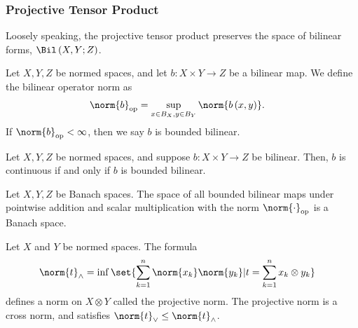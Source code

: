 \documentclass[10pt]{mypackage}
\begin{document}
\subsubsection{Projective Tensor Product}%
Loosely speaking, the projective tensor product preserves the space of bilinear forms, $\Bil\left(X,Y;Z\right)$.
\begin{definition}
  Let $X,Y,Z$ be normed spaces, and let $b: X\times Y\rightarrow Z$ be a bilinear map. We define the bilinear operator norm as
  \begin{align*}
    \norm{b}_{\text{op}} &= \sup_{x\in B_X,y\in B_Y}\norm{b\left(x,y\right)}.
  \end{align*}
  If $\norm{b}_{\text{op}} < \infty$, then we say $b$ is bounded bilinear.
\end{definition}
\begin{proposition}
  Let $X,Y,Z$ be normed spaces, and suppose $b: X\times Y\rightarrow Z$ be bilinear. Then, $b$ is continuous if and only if $b$ is bounded bilinear.
\end{proposition}
\begin{proposition}
  Let $X,Y,Z$ be Banach spaces. The space of all bounded bilinear maps under pointwise addition and scalar multiplication with the norm $\norm{\cdot}_{\text{op}}$ is a Banach space.
\end{proposition}
\begin{proposition}
  Let $X$ and $Y$ be normed spaces. The formula
  \begin{align*}
    \norm{t}_{\wedge} &= \inf\set{\sum_{k=1}^{n}\norm{x_k}\norm{y_k}| t = \sum_{k=1}^{n}x_k\otimes y_k}
  \end{align*}
  defines a norm on $X\otimes Y$ called the projective norm. The projective norm is a cross norm, and satisfies $\norm{t}_{\vee}\leq \norm{t}_{\wedge}$.
\end{proposition}
\end{document}
